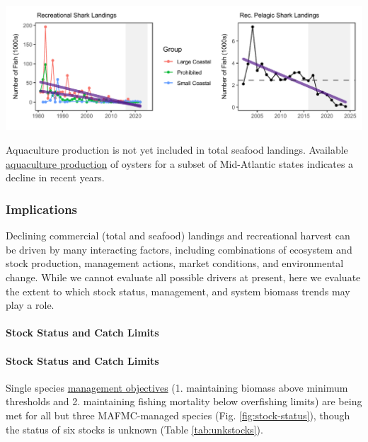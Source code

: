 \documentclass[
  10pt,
]{article}
\let\origfigure\figure
\let\endorigfigure\endfigure
\renewenvironment{figure}[1][2] {
    \expandafter\origfigure\expandafter[H]
} {
    \endorigfigure
}
\begin{document}
\begin{figure}

{\centering \includegraphics{midatlantic_files/figure-latex/rec-hms-1} 

}

\caption{Recreational shark landings from Marine Recreational Information Program (left) and Large Pelagics Survey (right) with declining trends (purple).}\label{fig:rec-hms}
\end{figure}

Aquaculture production is not yet included in total seafood landings. Available \href{https://noaa-edab.github.io/catalog/aquaculture.html}{aquaculture production} of oysters for a subset of Mid-Atlantic states indicates a decline in recent years.

\subsubsection{Implications}\label{implications}

Declining commercial (total and seafood) landings and recreational harvest can be driven by many interacting factors, including combinations of ecosystem and stock production, management actions, market conditions, and environmental change. While we cannot evaluate all possible drivers at present, here we evaluate the extent to which stock status, management, and system biomass trends may play a role.

\paragraph{Stock Status and Catch Limits}\label{stock-status-and-catch-limits}

\paragraph{Stock Status and Catch Limits}\label{stock-status-and-catch-limits-1}

Single species \href{https://noaa-edab.github.io/catalog/stock_status.html}{management objectives} (1. maintaining biomass above minimum thresholds and 2. maintaining fishing mortality below overfishing limits) are being met for all but three MAFMC-managed species (Fig. \ref{fig:stock-status}), though the status of six stocks is unknown (Table \ref{tab:unkstocks}).
\end{document}
